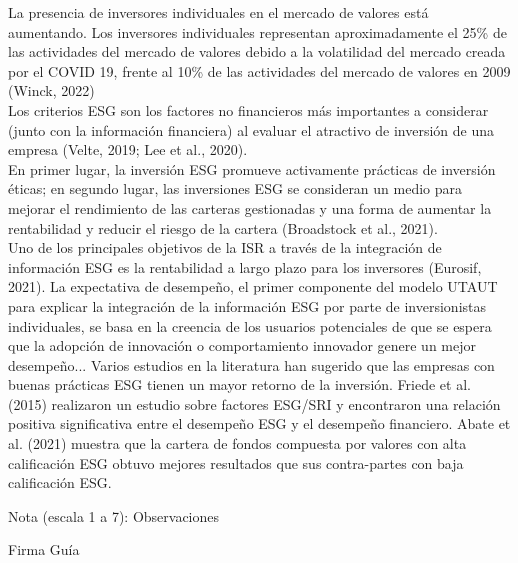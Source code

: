 \documentclass[11pt,letterpaper]{article}
\begin{document}
La presencia de inversores individuales en el mercado de valores está aumentando. Los inversores individuales representan aproximadamente el 25\% de las actividades del mercado de valores debido a la volatilidad del mercado creada por el COVID 19, frente al 10\% de las actividades del mercado de valores en 2009 (Winck, 2022)\\

Los criterios ESG son los factores no financieros más importantes a considerar (junto con la información financiera) al evaluar el atractivo de inversión de una empresa (Velte, 2019; Lee et al., 2020).\\

En primer lugar, la inversión ESG promueve activamente prácticas de inversión éticas; en segundo lugar, las inversiones ESG se consideran un medio para mejorar el rendimiento de las carteras gestionadas y una forma de aumentar la rentabilidad y reducir el riesgo de la cartera (Broadstock et al., 2021).\\

Uno de los principales objetivos de la ISR a través de la integración de información ESG es la rentabilidad a largo plazo para los inversores (Eurosif, 2021). La expectativa de desempeño, el primer componente del modelo UTAUT para explicar la integración de la información ESG por parte de inversionistas individuales, se basa en la creencia de los usuarios potenciales de que se espera que la adopción de innovación o comportamiento innovador genere un mejor desempeño... Varios estudios en la literatura han sugerido que las empresas con buenas prácticas ESG tienen un mayor retorno de la inversión. Friede et al. (2015) realizaron un estudio sobre factores ESG/SRI y encontraron una relación positiva significativa entre el desempeño ESG y el desempeño financiero. Abate et al. (2021) muestra que la cartera de fondos compuesta por valores con alta calificación ESG obtuvo mejores resultados que sus contra-partes con baja calificación ESG.



\vspace{3cm}


Nota (escala 1 a 7): 
\vspace{3cm}
Observaciones



\centering Firma Guía



    






\newpage











































\end{document}

